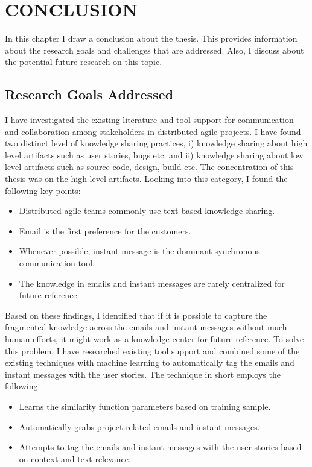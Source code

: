 \fancyhead[RO,LE]{\thepage}
\fancyfoot{} 
\chapter{CONCLUSION} 
In this chapter I draw a conclusion about the thesis. This provides information about the research goals and challenges that are addressed. Also, I discuss about the potential future research on this topic.

\section{Research Goals Addressed}
I have investigated the existing literature and tool support for communication and collaboration among stakeholders in distributed agile projects. I have found two distinct level of knowledge sharing practices, i) knowledge sharing about high level artifacts such as user stories, bugs etc. and ii) knowledge sharing about low level artifacts such as source code, design, build etc. The concentration of this thesis was on the high level artifacts. Looking into this category, I found the following key points:
\begin{itemize}
	\item Distributed agile teams commonly use text based knowledge sharing.
	\item Email is the first preference for the customers.
	\item Whenever possible, instant message is the dominant synchronous communication tool.	
	\item The knowledge in emails and instant messages are rarely centralized for future reference.
\end{itemize}

Based on these findings, I identified that if it is possible to capture the fragmented knowledge across the emails and instant messages without much human efforts, it might work as a knowledge center for future reference. To solve this problem, I have researched existing tool support and combined some of the existing techniques with machine learning to automatically tag the emails and instant messages with the user stories. The technique in short employs the following:
\begin{itemize}
	\item Learns the similarity function parameters based on training sample.
	\item Automatically grabs project related emails and instant messages.
	\item Attempts to tag the emails and instant messages with the user stories based on context and text relevance.
\end{itemize}

